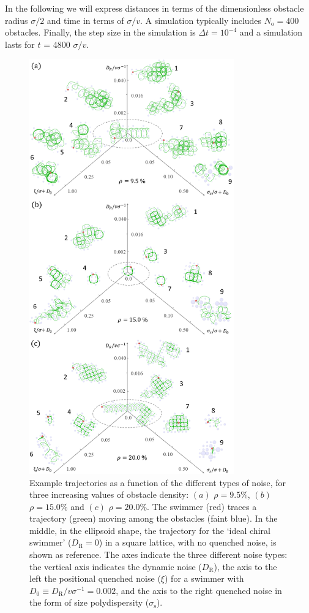 \documentclass[aps,pre,twocolumn,showpacs,superscriptaddress,amsmath,amssymb,longbibliography]{revtex4-2}
\begin{document}
In the following we will express distances in terms of the dimensionless obstacle radius $\sigma/2$ and time in terms of $\sigma/v$. A simulation typically includes $N_{\textrm{o}} = 400$ obstacles. Finally, the step size in the simulation is $\Delta t = 10^{-4}$ and a simulation lasts for $t$ = 4800 $\sigma/v$.
\begin{figure}[ht!]
\centering
  \includegraphics[height=17.9cm]{fig_3.png}
  \caption{Example trajectories as a function of the different types of noise, for three increasing values of obstacle density: $(a)$ $\rho = 9.5 \%$, $(b)$ $\rho = 15.0 \%$ and $(c)$ $\rho = 20.0 \%$. The swimmer (red) traces a trajectory (green) moving among the obstacles (faint blue). In the middle, in the ellipsoid shape, the trajectory for the `ideal chiral swimmer' ($D_{\textrm{R}}=0$) in a square lattice, with no quenched noise, is shown as reference. The axes indicate the three different noise types: the vertical axis indicates the dynamic noise ($D_{\textrm{R}}$), the axis to the left the positional quenched noise ($\xi$) for a swimmer with $D_{\textrm{0}} \equiv D_{\textrm{R}}/v\sigma^{-1} =0.002$, and the axis to the right quenched noise in the form of size polydispersity ($\sigma_{\textrm{s}}$).}
  \label{fig_trajectories}
\end{figure}
\end{document}
